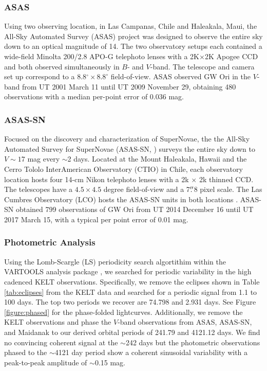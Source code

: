 \documentclass[twocolumn]{aastex61}
\begin{document}
\subsubsection{ASAS}
Using two observing location, in Las Campanas, Chile and Haleakala, Maui, the All-Sky Automated Survey (ASAS) project was designed to observe the entire sky down to an optical magnitude of 14. The two observatory setups each contained a wide-field Minolta 200/2.8 APO-G telephoto lenses with a 2K$\times$2K Apogee CCD and both observed simultaneously in $B$- and $V$-band. The telescope and camera set up correspond to a 8.8$^{\circ}\times8.8^{\circ}$ field-of-view. ASAS observed GW Ori in the $V$-band from UT 2001 March 11 until UT 2009 November 29, obtaining 480 observations with a median per-point error of 0.036 mag.

\subsubsection{ASAS-SN}
Focused on the discovery and characterization of SuperNovae, the the All-Sky Automated Survey for SuperNovae (ASAS-SN, \citet{Shappee14}) surveys the entire sky down to $V \sim 17$ mag every $\sim$2 days. Located at the Mount Haleakala, Hawaii and the Cerro Tololo InterAmerican Observatory (CTIO) in Chile, each observatory location hosts four 14-cm Nikon telephoto lenses with a 2k $\times$ 2k thinned CCD. The telescopes have a $4.5\times4.5$ degree field-of-view and a 7$\mbox{$.\!\!^{\prime\prime}$}$8 pixel scale. The Las Cumbres Observatory (LCO) hosts the ASAS-SN units in both locations \citep{Brown13}. ASAS-SN obtained 799 observations of GW Ori from UT 2014 December 16 until UT 2017 March 15, with a typical per point error of 0.01 mag.

\subsubsection{Photometric Analysis}
Using the Lomb-Scargle (LS) periodicity search algortithim \citep{Lomb76,Scargle82} within the VARTOOLS analysis package \citep{Hartman:12}, we searched for periodic variability in the high cadenced KELT observations. Specifically, we remove the eclipses shown in Table \ref{tab:eclipses} from the KELT data and searched for a periodic signal from 1.1 to 100 days. The top two periods we recover are 74.798 and 2.931 days. See Figure \ref{figure:phased} for the phase-folded lightcurves. Additionally, we remove the KELT observations and phase the $V$-band observations from ASAS, ASAS-SN, and Maidanak to our derived orbital periods of 241.79 and 4121.12 days. We find no convincing coherent signal at the $\sim$242 days but the photometric observations phased to the $\sim$4121 day period show a coherent sinusoidal variability with a peak-to-peak amplitude of $\sim$0.15 mag. 
\end{document}
